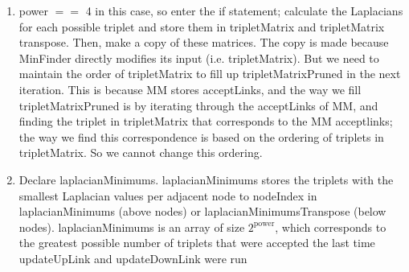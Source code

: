 \documentclass[11pt]{article}
\begin{document}
\begin{enumerate}
	\item power $==$ 4 in this case, so enter the if statement; calculate the Laplacians for each possible triplet and store them in tripletMatrix and tripletMatrix transpose. Then, make a copy of these matrices. The copy is made because MinFinder directly modifies its input (i.e. tripletMatrix). But we need to maintain the order of tripletMatrix to fill up tripletMatrixPruned in the next iteration. This is because MM stores acceptLinks, and the way we fill tripletMatrixPruned is by iterating through the acceptLinks of MM, and finding the triplet in tripletMatrix that corresponds to the MM acceptlinks; the way we find this correspondence is based on the ordering of triplets in tripletMatrix. So we cannot change this ordering. 
	\item Declare laplacianMinimums. laplacianMinimums stores the triplets with the smallest Laplacian values per adjacent node to nodeIndex in laplacianMinimums (above nodes) or laplacianMinimumsTranspose (below nodes). laplacianMinimums is an array of size $2^{\text{power}}$, which corresponds to the greatest possible number of triplets that were accepted the last time updateUpLink and updateDownLink were run


\end{enumerate}
\end{document}
